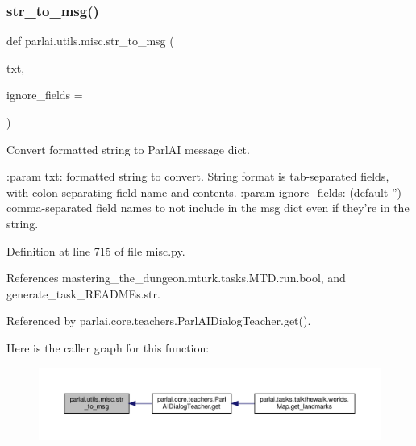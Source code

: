 \subsubsection{\texorpdfstring{str\+\_\+to\+\_\+msg()}{str\_to\_msg()}}
{\footnotesize\ttfamily def parlai.\+utils.\+misc.\+str\+\_\+to\+\_\+msg (\begin{DoxyParamCaption}\item[{}]{txt,  }\item[{}]{ignore\+\_\+fields = {\ttfamily \textquotesingle{}\textquotesingle{}} }\end{DoxyParamCaption})}

\begin{DoxyVerb}Convert formatted string to ParlAI message dict.

:param txt:
    formatted string to convert. String format is tab-separated fields,
    with colon separating field name and contents.
:param ignore_fields:
    (default '') comma-separated field names to not
    include in the msg dict even if they're in the string.
\end{DoxyVerb}
 

Definition at line 715 of file misc.\+py.



References mastering\+\_\+the\+\_\+dungeon.\+mturk.\+tasks.\+M\+T\+D.\+run.\+bool, and generate\+\_\+task\+\_\+\+R\+E\+A\+D\+M\+Es.\+str.



Referenced by parlai.\+core.\+teachers.\+Parl\+A\+I\+Dialog\+Teacher.\+get().

Here is the caller graph for this function\+:
\nopagebreak
\begin{figure}[H]
\begin{center}
\leavevmode
\includegraphics[width=350pt]{namespaceparlai_1_1utils_1_1misc_a1b053cd9c56e6fa79b058fff587b3a48_icgraph}
\end{center}
\end{figure}
\mbox{\label{namespaceparlai_1_1utils_1_1misc_acf146e70ea7f6867969a7c2b545d4b4b}} 

